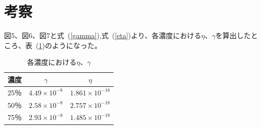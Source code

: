 \documentclass[a4j,10pt]{jarticle}
\newcommand{\Tabref}[1]{表~(\ref{#1})}
\newcommand{\Equref}[1]{式~(\ref{#1})}
\begin{document}
\section{考察}
図5、図6、図7と\Equref{gamma},\Equref{eta}より、各濃度における$\eta$、$\gamma$を算出したところ、\Tabref{kousatu}のようになった。
\begin{table}[h]
\begin{center}
\caption{各濃度における$\eta$、$\gamma$}
\label{kousatu}
\begin{tabular}{|c|c|c|}\hline
濃度& $\gamma$ & $\eta$ \\ \hline \hline
  25％& $4.49 \times 10^{-8}$ & $1.861 \times 10^{-18}$ \\ \hline
  50％& $2.58 \times 10^{-8}$ & $2.757 \times 10^{-18}$ \\ \hline
  75％& $2.93 \times 10^{-8}$ & $1.485 \times 10^{-18}$ \\ \hline
\end{tabular}
\end{center}
\end{table}
\end{document}
